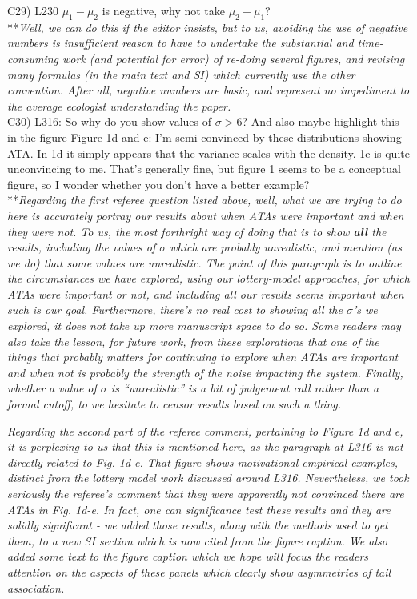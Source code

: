 \documentclass[letterpaper,11pt]{article}
\begin{document}
\noindent C29) L230 $\mu_1-\mu_2$ is negative, why not take $\mu_2-\mu_1$? \\

\noindent ***\emph{Well, we can do this if the editor insists, but to us, avoiding the use of
negative numbers is insufficient reason to have to undertake the substantial and time-consuming 
work (and potential for error) 
of re-doing several figures, and revising many formulas (in the main text and SI) which currently use the other convention.
After all, negative numbers are basic, and represent no impediment to the average ecologist understanding the 
paper.} \\

\noindent C30) L316: So why do you show values of $\sigma >6$? And also maybe highlight this in the figure Figure 1d and e: I’m semi convinced by these distributions showing ATA. In 1d it simply appears that the variance scales with the density. 1e is quite unconvincing to me. That’s generally fine, but figure 1 seems to be a conceptual figure, so I wonder whether you don’t have a better example? \\

\noindent ***\emph{Regarding the first referee question listed above, well, what we are 
trying to do here is accurately portray our results about
when ATAs were important and when they were not. To us, the most forthright way of doing that is to
show \textbf{all} the results, including the values of $\sigma$ which are probably unrealistic, and mention
(as we do) that some values are unrealistic. The point of this paragraph is to outline the circumstances
we have explored, using our lottery-model approaches, for which ATAs were important or not, and including all
our results seems important when such is our goal. Furthermore, there's no real cost to showing
all the $\sigma$'s we explored, it does not take up more manuscript space to do so.
Some readers may also take the lesson, for future work, from these explorations that one of the things that probably 
matters for continuing to explore when ATAs are important and when not is probably the strength
of the noise impacting the system. Finally, whether a value of $\sigma$ is ``unrealistic'' is 
a bit of judgement call rather than a formal cutoff, to we hesitate to censor results 
based on such a thing.}

\emph{Regarding the second part of the referee comment, pertaining to Figure 1d and e, it is perplexing to us that 
this is mentioned here,
as the paragraph at L316 is not directly related to Fig. 1d-e. That figure
shows motivational empirical examples, distinct from the lottery model work discussed around L316. Nevertheless, we took
seriously the referee's comment that they were apparently not convinced there are ATAs in Fig. 1d-e.
In fact, one can significance test these results and they are solidly significant - we added
those results, along with the methods used to get them, to a new SI section which is now cited from the
figure caption. We also added some text to the figure caption which we hope will focus the 
readers attention on the aspects of these panels which clearly show asymmetries of tail association. } \\
\end{document}
